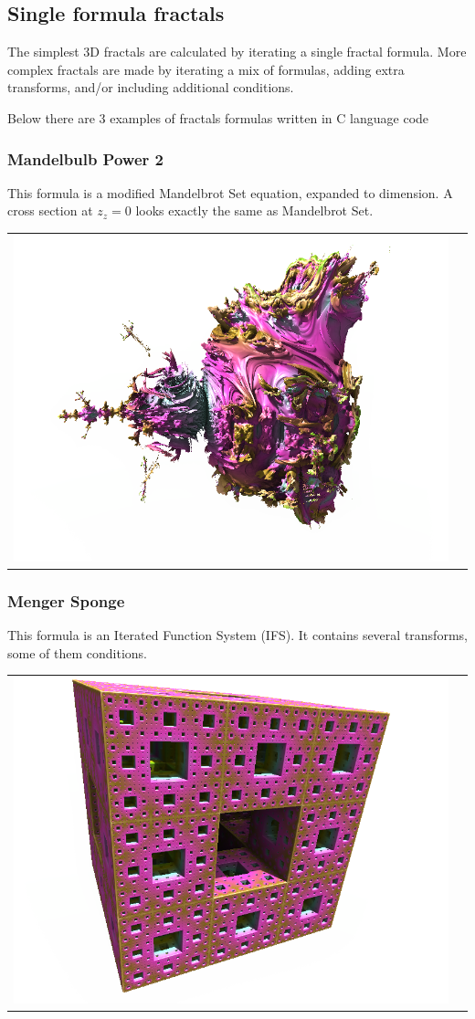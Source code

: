 \subsection{Single formula fractals}\label{single-formula-fractals}

The simplest 3D fractals are calculated by iterating a single fractal formula. More complex fractals are made by iterating a mix of formulas, adding extra transforms, and/or including additional conditions. 

Below there are 3 examples of fractals formulas written in C language code

\subsubsection{Mandelbulb Power 2} \nopagebreak

This formula is a modified Mandelbrot Set equation, expanded to  dimension.
A cross section at $ z_z = 0 $ looks exactly the same as Mandelbrot Set.
\nopagebreak

\begin{tabular}{l l}
	\includegraphics[width=0.3\linewidth]{img/manual/media/formula_mandelbulb_power_2}	
	& 
	\begin{minipage}[b]{0.5\linewidth}
		
	\end{minipage}
\end{tabular} 

\subsubsection{Menger Sponge} \nopagebreak

This formula is an Iterated Function System (IFS). It contains several
transforms, some of them conditions. \nopagebreak

\begin{tabular}{l l}
	\includegraphics[width=0.3\linewidth]{img/manual/media/formula_menger_sponge.png}	
	& 
	\begin{minipage}[b]{0.5\linewidth}
		
	\end{minipage}
\end{tabular} 

